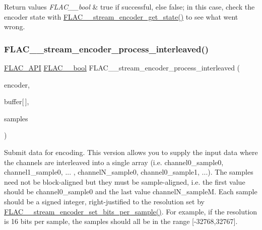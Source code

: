 \begin{DoxyRetVals}{Return values}
{\em F\+L\+A\+C\+\_\+\+\_\+bool} & {\ttfamily true} if successful, else {\ttfamily false}; in this case, check the encoder state with \mbox{\hyperlink{group__flac__stream__encoder_gaff7284e55f01b59ed8f03317df510992}{F\+L\+A\+C\+\_\+\+\_\+stream\+\_\+encoder\+\_\+get\+\_\+state()}} to see what went wrong. \\
\hline
\end{DoxyRetVals}
\mbox{\label{group__flac__stream__encoder_ga67c2ff5b23b945180797de420b1f27c0}} 
\subsubsection{\texorpdfstring{FLAC\_\_stream\_encoder\_process\_interleaved()}{FLAC\_\_stream\_encoder\_process\_interleaved()}}
{\footnotesize\ttfamily \mbox{\hyperlink{group__flac__export_ga56ca07df8a23310707732b1c0007d6f5}{F\+L\+A\+C\+\_\+\+A\+PI}} \mbox{\hyperlink{ordinals_8h_a95103469f1cbd78b8cf250194985b34e}{F\+L\+A\+C\+\_\+\+\_\+bool}} F\+L\+A\+C\+\_\+\+\_\+stream\+\_\+encoder\+\_\+process\+\_\+interleaved (\begin{DoxyParamCaption}\item[{\mbox{\hyperlink{struct_f_l_a_c_____stream_encoder}{F\+L\+A\+C\+\_\+\+\_\+\+Stream\+Encoder}} $\ast$}]{encoder,  }\item[{const \mbox{\hyperlink{ordinals_8h_a33fd77bfe6d685541a0c034a75deccdc}{F\+L\+A\+C\+\_\+\+\_\+int32}}}]{buffer\mbox{[}$\,$\mbox{]},  }\item[{unsigned}]{samples }\end{DoxyParamCaption})}

Submit data for encoding. This version allows you to supply the input data where the channels are interleaved into a single array (i.\+e. channel0\+\_\+sample0, channel1\+\_\+sample0, ... , channel\+N\+\_\+sample0, channel0\+\_\+sample1, ...). The samples need not be block-\/aligned but they must be sample-\/aligned, i.\+e. the first value should be channel0\+\_\+sample0 and the last value channel\+N\+\_\+sampleM. Each sample should be a signed integer, right-\/justified to the resolution set by \mbox{\hyperlink{group__flac__stream__encoder_ga5a21cf7f86a81df6ba72714a6b917aa3}{F\+L\+A\+C\+\_\+\+\_\+stream\+\_\+encoder\+\_\+set\+\_\+bits\+\_\+per\+\_\+sample()}}. For example, if the resolution is 16 bits per sample, the samples should all be in the range \mbox{[}-\/32768,32767\mbox{]}.

